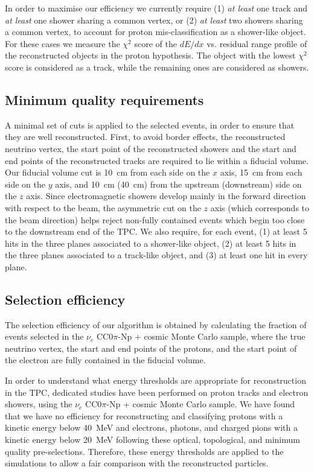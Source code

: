 In order to maximise our efficiency we currently require (1) \emph{at least} one track and \emph{at least} one shower sharing a common vertex, or (2) \emph{at least} two showers sharing a common vertex, to account for proton mis-classification as a shower-like object. For these cases we measure the $\chi^2$ score of the $dE/dx$ vs. residual range profile of the reconstructed objects in the proton hypothesis. The object with the lowest $\chi^2$ score is considered as a track, while the remaining ones are considered as showers.

\subsection{Minimum quality requirements}\label{sec:precuts}
A minimal set of cuts is applied to the selected events, in order to ensure that they are well reconstructed.
First, to avoid border effects, the reconstructed neutrino vertex, the start point of the reconstructed showers and the start and end points of the reconstructed tracks are required to lie within a fiducial volume. Our fiducial volume cut is 10~cm from each side on the $x$ axis, 15~cm from each side on the $y$ axis, and 10~cm (40~cm) from the upstream (downstream) side on the $z$ axis. 
Since electromagnetic showers develop mainly in the forward direction with respect to the beam, the asymmetric cut on the $z$ axis (which corresponds to the beam direction) helps reject non-fully contained events which begin too close to the downstream end of the TPC.
We also require, for each event, (1) at least 5 hits in the three planes associated to a shower-like object, (2) at least 5 hits in the three planes associated to a track-like object, and (3) at least one hit in every plane.


\subsection{Selection efficiency}\label{sec:eff}
The selection efficiency of our algorithm is obtained by calculating the fraction of events selected in the $\nu_{e}$ CC$0\pi$-Np + cosmic Monte Carlo sample, where the true neutrino vertex, the start and end points of the protons, and the start point of the electron are fully contained in the fiducial volume.

In order to understand what energy thresholds are appropriate for reconstruction in the TPC, dedicated studies have been performed on proton tracks and electron showers, using the $\nu_{e}$ CC$0\pi$-Np + cosmic Monte Carlo sample. We have found that we have no efficiency for reconstructing and classifying protons {with a kinetic energy} below 40~MeV and electrons{, photons, and charged pions} {with a kinetic energy} below 20~MeV following these optical, topological, and minimum quality pre-selections. Therefore, these energy thresholds are applied to the simulations to allow a fair comparison with the reconstructed particles. 

